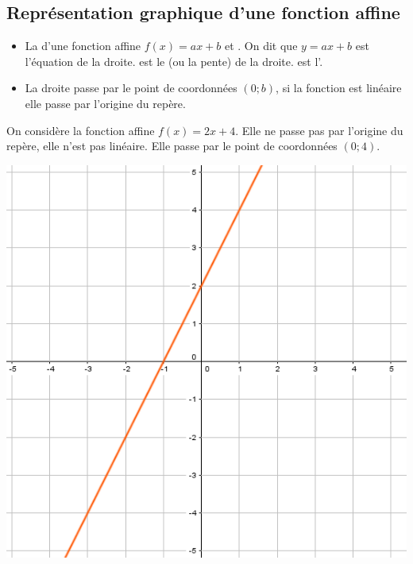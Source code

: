 \documentclass[12pt,a4paper]{article}
\begin{document}
\subsection{Représentation graphique d'une fonction affine}	

\begin{myprops}
	\begin{itemize}
		\item La  d'une fonction affine $f(x)=ax+b$ et . On dit que $y=ax+b$ est l'équation de la droite.
		 est le  (ou la pente) de la droite.
		 est l'.
		\item La droite passe par le point de coordonnées $(0;b)$, si la fonction est linéaire elle passe par l'origine du repère.
	\end{itemize}
	
\end{myprops}

\begin{myex}
	\begin{multicols}{2}
		\vspace*{1.5cm}
		On considère la fonction affine $f(x)=2x+4$. Elle ne passe pas par l'origine du repère, elle n'est pas linéaire. Elle passe par le point de coordonnées $(0;4)$.
		
		\includegraphics[scale=0.5]{img/ex1}
	\end{multicols}
\end{myex}
\end{document}
